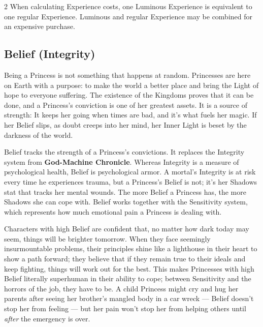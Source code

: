 \begin{multicols}{2}
When calculating Experience costs, one Luminous Experience is equivalent to one regular Experience. Luminous and regular Experience may be combined for an expensive purchase. 

\subsection*{Belief (Integrity)}
\label{subsec:Belief} 
\noindent Being a Princess is not something that happens at random. Princesses are here on Earth with a purpose: to make the world a better place and bring the Light of hope to everyone suffering. The existence of the Kingdoms proves that it can be done, and a Princess's conviction is one of her greatest assets. It is a source of strength: It keeps her going when times are bad, and it's what fuels her magic. If her Belief slips, as doubt creeps into her mind, her Inner Light is beset by the darkness of the world.



Belief tracks the strength of a Princess's convictions. It replaces the Integrity system from \textbf{God-Machine Chronicle}. Whereas Integrity is a measure of psychological health, Belief is psychological armor. A mortal's Integrity is at risk every time he experiences trauma, but a Princess's Belief is not; it's her Shadows stat that tracks her mental wounds. The more Belief a Princess has, the more Shadows she can cope with. Belief works together with the Sensitivity system, which represents how much emotional pain a Princess is dealing with.


Characters with high Belief are confident that, no matter how dark today may seem, things will be brighter tomorrow. When they face seemingly insurmountable 
problems, their principles shine like a lighthouse in their heart to show a path forward; they believe that if they remain true to their ideals and keep fighting, 
things will work out for the best. This makes Princesses with high Belief literally superhuman in their ability to cope; between Sensitivity and the horrors of the 
job, they have to be. A child Princess might cry and hug her parents after seeing her brother's mangled body in a car wreck — Belief doesn't stop her from feeling — 
but her pain won't stop her from helping others until \textit{after} the emergency is over. 


\end{multicols}
